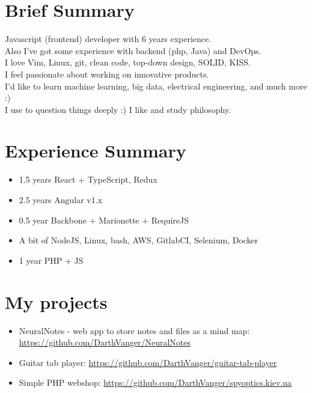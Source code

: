 \documentclass[a4paper, 14pt]{article}
\begin{document}
\begin{center}
	\textsc{\Huge{}}
\end{center}


\section{Brief Summary}
  Javascript (frontend) developer with 6 years experience.  \\
  Also I've got some experience with backend (php, Java) and DevOps.  \\
  I love Vim, Linux, git, clean code, top-down design, SOLID, KISS. \\
  I feel passionate about working on innovative products. \\
  I'd like to learn machine learning, big data, electrical engineering, and much more :) \\
  I use to question things deeply :) I like and study philosophy. \\

\section{Experience Summary}
  \begin{itemize}
    \item 1.5 years React + TypeScript, Redux \\
    \item 2.5 years Angular v1.x \\ 
    \item 0.5 year Backbone + Marionette + RequireJS \\ 
    \item A bit of NodeJS, Linux, bash, AWS, GitlabCI, Selenium, Docker \\
    \item 1 year PHP + JS
  \end{itemize}

\section{My projects}
  \begin{itemize}
    \item NeuralNotes - web app to store notes and files as a mind map: \url{https://github.com/DarthVanger/NeuralNotes} \\
    \item Guitar tab player: \url{https://github.com/DarthVanger/guitar-tab-player} \\
    \item Simple PHP webshop: \url{https://github.com/DarthVanger/spyoptics.kiev.ua} \\
  \end{itemize}
\end{document}
